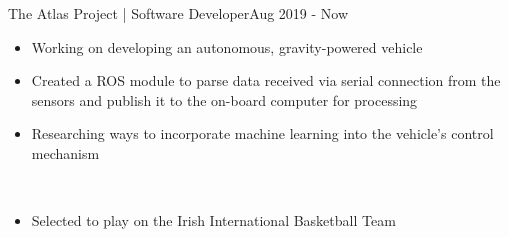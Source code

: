 
\begin{projects}

    \extracurricular
    {The Atlas Project | Software Developer}{Aug 2019 - Now}
    {
	    \begin{itemize}
    	    \item Working on developing an autonomous, gravity-powered vehicle
    	    \item Created a ROS module to parse data received via serial connection from the sensors and publish it to the on-board computer for processing
    	    \item Researching ways to incorporate machine learning into the vehicle's control mechanism
		\end{itemize}
    }
	\\

	\smallskip

    {
    \begin{itemize}
        \item Selected to play on the Irish International Basketball Team
    \end{itemize}
    }

\end{projects}
